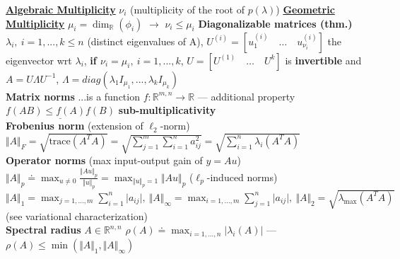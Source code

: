 \documentclass[a4paper]{article}
\begin{document}
\textbf{\underline{Algebraic Multiplicity}} $\nu_i$ (multiplicity of the root of $p(\lambda)$) \textbf{\underline{Geometric Multiplicity}} $\mu_i=\dim_{\mathbb{R}}(\phi_i)$ $\longrightarrow$ $\nu_i \le \mu_i$
\textbf{Diagonalizable matrices (thm.)} $\lambda_i, \ i=1,...,k \le n$ (distinct eigenvalues of A), $U^{(i)}=[u_1^{(i)}\quad\dots\quad{u_{\nu_i}^{(i)}}]$ the eigenvector wrt $\lambda_i$, \textbf{if $\nu_i=\mu_i, \  i=1,...,k$}, $U=[U^{(1)}\quad\dots\quad{U^{k}}]$ is \textbf{invertible} and $A=U{\Lambda}U^{-1}$, $\Lambda=diag(\lambda_1{I_{\mu_1}}, ...,\lambda_k{I_{\mu_k}})$\\
\textbf{Matrix norms} ...is a function $f:\mathbb{R}^{m,n}\to\mathbb{R}$ --- additional property $\underline{f(AB)\le{f(A) f(B)}}$ \textbf{sub-multiplicativity}\\
\textbf{Frobenius norm} (extension of $\ell_2$-norm) $\Vert A \Vert_F = \sqrt{\text{trace}(A^T A)} = \sqrt{
    \sum_{j=1}^m {\sum_{i=1}^n { a_{ij}^2}}} = \sqrt{\sum_{i=1}^n \lambda_i(A^T A)}$ \\
\textbf{Operator norms} (max input-output gain of $y=Au$) $\Vert A \Vert_p \doteq \max_{u{\ne}0}\frac{\Vert Au \Vert_p}{\Vert u \Vert_p}=
\max_{\Vert{u}\Vert_p=1}{\Vert Au \Vert_p}$ ($\ell_p$-induced norms)\\
$\Vert A \Vert_1 = \max_{j=1,...,m}{\sum_{i=1}^n \vert a_{ij} \vert}, \
\Vert A \Vert_\infty = \max_{i=1,...,m}{\sum_{j=1}^n \vert a_{ij} \vert}, \
\Vert  A \Vert_2 = \sqrt{\lambda_{\text{max}} (A^T A)} $ {\tiny{(see variational characterization)}}\\
\textbf{Spectral radius} $A\in\mathbb{R}^{n,n}$ $\rho(A)\doteq\max_{i=1,...,n} \vert \lambda_i(A) \vert$ --- $\rho(A)\le\min(\Vert A \Vert_1, \Vert A \Vert_\infty)$
\end{document}
